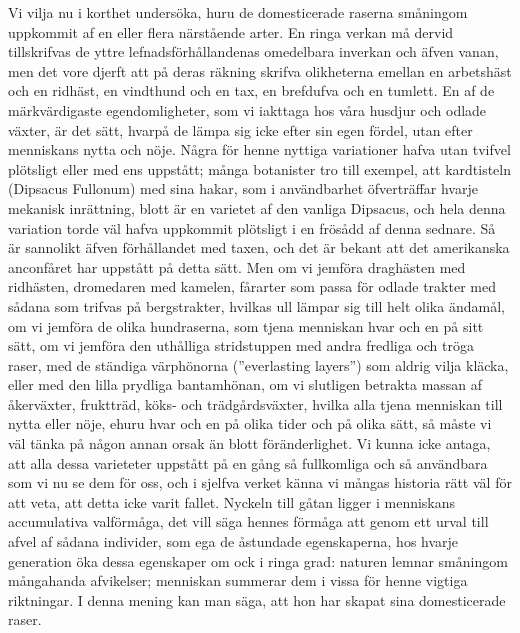 Vi vilja nu i korthet undersöka, huru de domesticerade raserna småningom uppkommit af en eller flera närstående arter. En ringa verkan må dervid tillskrifvas de yttre lefnadsförhållandenas omedelbara inverkan och äfven vanan, men det vore djerft att på deras räkning skrifva olikheterna emellan en arbetshäst och en ridhäst, en vindthund och en tax, en brefdufva och en tumlett. En af de märkvärdigaste egendomligheter, som vi iakttaga hos våra husdjur och odlade växter, är det sätt, hvarpå de lämpa sig icke efter sin egen fördel, utan efter menniskans nytta och nöje. Några för henne nyttiga variationer hafva utan tvifvel plötsligt eller med ens uppstått; många botanister tro till exempel, att kardtisteln (Dipsacus Fullonum) med sina hakar, som i användbarhet öfverträffar hvarje mekanisk inrättning, blott är en varietet af den vanliga Dipsacus, och hela denna variation torde väl hafva uppkommit plötsligt i en frösådd af denna sednare. Så är sannolikt äfven förhållandet med taxen, och det är bekant att det amerikanska anconfåret har uppstått på detta sätt. Men om vi jemföra draghästen med ridhästen, dromedaren med kamelen, fårarter som passa för odlade trakter med sådana som trifvas på bergstrakter, hvilkas ull lämpar sig till helt olika ändamål, om vi jemföra de olika hundraserna, som tjena menniskan hvar och en på sitt sätt, om vi jemföra den uthålliga stridstuppen med andra fredliga och tröga raser, med de ständiga värphönorna (”everlasting layers”) som aldrig vilja kläcka, eller med den lilla prydliga bantamhönan, om vi slutligen betrakta massan af åkerväxter, fruktträd, köks- och trädgårdsväxter, hvilka alla tjena menniskan till nytta eller nöje, ehuru hvar och en på olika tider och på olika sätt, så måste vi väl tänka på någon annan orsak än blott föränderlighet. Vi kunna icke antaga, att alla dessa varieteter uppstått på en gång så fullkomliga och så användbara som vi nu se dem för oss, och i sjelfva verket känna vi mångas historia rätt väl för att veta, att detta icke varit fallet. Nyckeln till gåtan ligger i menniskans accumulativa valförmåga, det vill säga hennes förmåga att genom ett urval till afvel af sådana individer, som ega de åstundade egenskaperna, hos hvarje generation öka dessa egenskaper om ock i ringa grad: naturen lemnar småningom mångahanda afvikelser; menniskan summerar dem i vissa för henne vigtiga riktningar. I denna mening kan man säga, att hon har skapat sina domesticerade raser.

